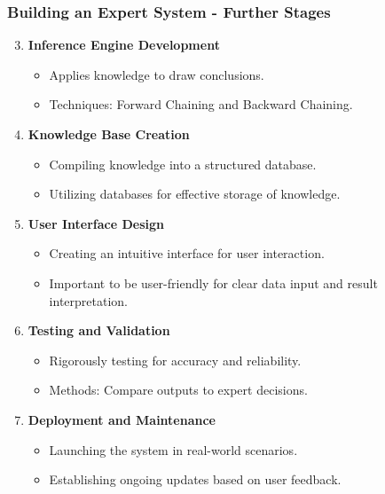 \documentclass[aspectratio=169]{beamer}
\begin{document}
\begin{frame}[fragile]
    \frametitle{Building an Expert System - Further Stages}
    \begin{enumerate}
        \setcounter{enumi}{2}  %
        \item \textbf{Inference Engine Development}
        \begin{itemize}
            \item Applies knowledge to draw conclusions.
            \item Techniques: Forward Chaining and Backward Chaining.
        \end{itemize}
        
        \item \textbf{Knowledge Base Creation}
        \begin{itemize}
            \item Compiling knowledge into a structured database.
            \item Utilizing databases for effective storage of knowledge.
        \end{itemize}

        \item \textbf{User Interface Design}
        \begin{itemize}
            \item Creating an intuitive interface for user interaction.
            \item Important to be user-friendly for clear data input and result interpretation.
        \end{itemize}

        \item \textbf{Testing and Validation}
        \begin{itemize}
            \item Rigorously testing for accuracy and reliability.
            \item Methods: Compare outputs to expert decisions.
        \end{itemize}

        \item \textbf{Deployment and Maintenance}
        \begin{itemize}
            \item Launching the system in real-world scenarios.
            \item Establishing ongoing updates based on user feedback.
        \end{itemize}
    \end{enumerate}
\end{frame}
\end{document}
